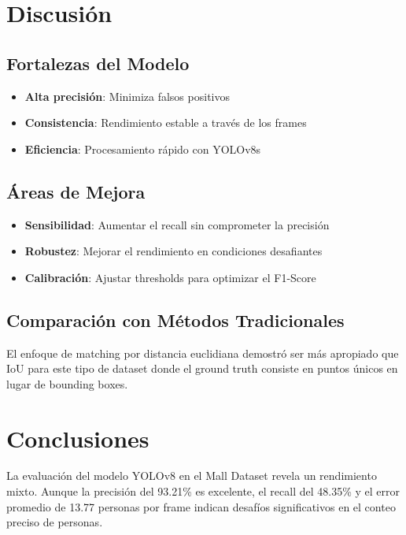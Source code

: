 \documentclass[12pt,a4paper]{article}
\begin{document}
\section{Discusión}

\subsection{Fortalezas del Modelo}

\begin{itemize}
    \item \textbf{Alta precisión}: Minimiza falsos positivos
    \item \textbf{Consistencia}: Rendimiento estable a través de los frames
    \item \textbf{Eficiencia}: Procesamiento rápido con YOLOv8s
\end{itemize}

\subsection{Áreas de Mejora}

\begin{itemize}
    \item \textbf{Sensibilidad}: Aumentar el recall sin comprometer la precisión
    \item \textbf{Robustez}: Mejorar el rendimiento en condiciones desafiantes
    \item \textbf{Calibración}: Ajustar thresholds para optimizar el F1-Score
\end{itemize}

\subsection{Comparación con Métodos Tradicionales}

El enfoque de matching por distancia euclidiana demostró ser más apropiado que IoU para este tipo de dataset donde el ground truth consiste en puntos únicos en lugar de bounding boxes.

\section{Conclusiones}

La evaluación del modelo YOLOv8 en el Mall Dataset revela un rendimiento mixto. Aunque la precisión del 93.21\% es excelente, el recall del 48.35\% y el error promedio de 13.77 personas por frame indican desafíos significativos en el conteo preciso de personas.
\end{document}
